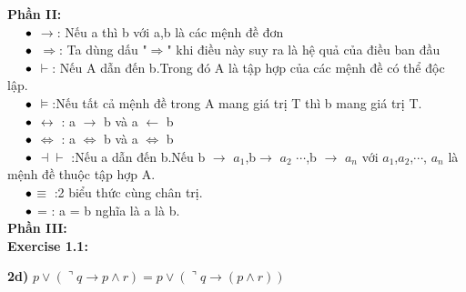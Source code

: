 \documentclass[a4paper]{article}
\begin{document}
\textbf{{\Large Phần II: }}\\

$\hspace{0.5 cm}\large\bullet$ $\rightarrow$: Nếu a thì b với a,b là các mệnh đề đơn\\

$\hspace{0.5 cm}\large\bullet$\ $\Rightarrow$: Ta dùng dấu "$\Rightarrow$" khi điều này suy ra là hệ quả của điều ban đầu\\

$\hspace{0.5 cm}\large\bullet$ $\vdash$: Nếu A dẫn đến b.Trong đó A là tập hợp của các mệnh đề có thể độc lập.\\

$\hspace{0.5 cm}\large\bullet$ $\models$:Nếu tất cả mệnh đề trong A mang giá trị T thì b mang giá trị T.\\

$\hspace{0.5 cm}\large\bullet$ $\longleftrightarrow$ : a $\rightarrow$ b và a $\leftarrow$ b\\

$\hspace{0.5 cm}\large\bullet$ $\Longleftrightarrow$ : a $\Longleftrightarrow$ b và a $\Longleftrightarrow$ b\\

$\hspace{0.5 cm}\large\bullet$ $\dashv\vdash$ :Nếu a dẫn đến b.Nếu b $\rightarrow$ $a_{1}$,b$\rightarrow$ $a_{2}$ $\cdots$,b $\rightarrow$  $a_{n}$ với $a_{1}$,$a_{2}$,$\cdots$,
$a_{n}$ là mệnh đề  thuộc tập hợp A.\\

$\hspace{0.5 cm}\large\bullet$$\equiv$ :2 biểu thức cùng chân trị.\\

$\hspace{0.5 cm}\large\bullet$ = : a = b nghĩa là a là b.\\

\textbf{{\Large Phần III: }}
\\

\textbf{\large\hspace{0.5cm} Exercise 1.1:}

\textbf{\large\hspace{1cm} 2d)}{\large\hspace{0.5cm}
	$	p \vee (\urcorner q \rightarrow p \wedge r) = p \vee (\urcorner q \rightarrow( p \wedge r))$}
\end{document}
